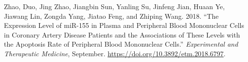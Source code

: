 \documentclass[smallextended]{svjour3}       %
\newlength{\cslhangindent}
\newlength{\cslentryspacingunit} %
\newenvironment{CSLReferences}[2] %
 {%
  \setlength{\parindent}{0pt}
  \ifodd #1
  \let\oldpar\par
  \def\par{\hangindent=\cslhangindent\oldpar}
  \fi
  \setlength{\parskip}{#2\cslentryspacingunit}
 }%
 {}
\begin{document}
\begin{CSLReferences}{1}{0}
\leavevmode{}%
Zhao, Duo, Jing Zhao, Jiangbin Sun, Yanling Su, Jinfeng Jian, Huaan Ye,
Jiawang Lin, Zongda Yang, Jiatao Feng, and Zhiping Wang. 2018. {``The
Expression Level of {miR}-155 in Plasma and Peripheral Blood Mononuclear
Cells in Coronary Artery Disease Patients and the Associations of These
Levels with the Apoptosis Rate of Peripheral Blood Mononuclear Cells.''}
\emph{Experimental and Therapeutic Medicine}, September.
\url{https://doi.org/10.3892/etm.2018.6797}.

\end{CSLReferences}




\end{document}
